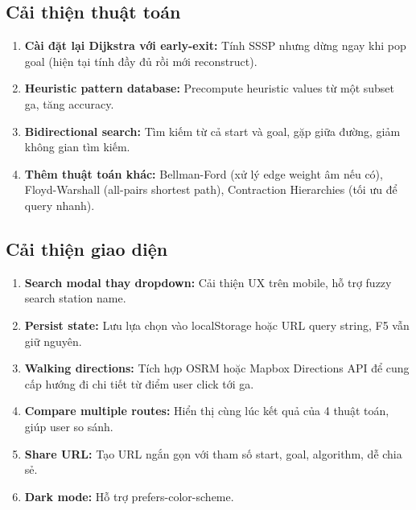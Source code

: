 \subsection{Cải thiện thuật toán}

\begin{enumerate}
  \item \textbf{Cài đặt lại Dijkstra với early-exit:} Tính SSSP nhưng dừng ngay khi pop goal (hiện tại tính đầy đủ rồi mới reconstruct).

  \item \textbf{Heuristic pattern database:} Precompute heuristic values từ một subset ga, tăng accuracy.

  \item \textbf{Bidirectional search:} Tìm kiếm từ cả start và goal, gặp giữa đường, giảm không gian tìm kiếm.

  \item \textbf{Thêm thuật toán khác:} Bellman-Ford (xử lý edge weight âm nếu có), Floyd-Warshall (all-pairs shortest path), Contraction Hierarchies (tối ưu để query nhanh).
\end{enumerate}

\subsection{Cải thiện giao diện}

\begin{enumerate}
  \item \textbf{Search modal thay dropdown:} Cải thiện UX trên mobile, hỗ trợ fuzzy search station name.

  \item \textbf{Persist state:} Lưu lựa chọn vào localStorage hoặc URL query string, F5 vẫn giữ nguyên.

  \item \textbf{Walking directions:} Tích hợp OSRM hoặc Mapbox Directions API để cung cấp hướng đi chi tiết từ điểm user click tới ga.

  \item \textbf{Compare multiple routes:} Hiển thị cùng lúc kết quả của 4 thuật toán, giúp user so sánh.

  \item \textbf{Share URL:} Tạo URL ngắn gọn với tham số start, goal, algorithm, dễ chia sẻ.

  \item \textbf{Dark mode:} Hỗ trợ prefers-color-scheme.
\end{enumerate}

